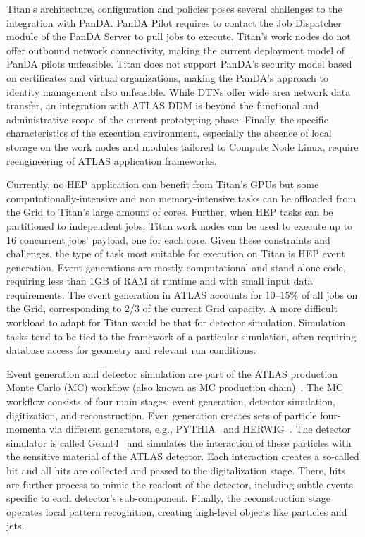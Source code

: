 Titan's architecture, configuration and policies poses several challenges to the
integration with PanDA. PanDA Pilot requires to contact the Job Dispatcher
module of the PanDA Server to pull jobs to execute. Titan's work nodes do not
offer outbound network connectivity, making the current deployment model of
PanDA pilots unfeasible. Titan does not support PanDA's security model based on
certificates and virtual organizations, making the PanDA's approach to identity
management also unfeasible. While DTNs offer wide area network data transfer, an
integration with ATLAS DDM is beyond the functional and administrative scope of
the current prototyping phase. Finally, the specific characteristics of the
execution environment, especially the absence of local storage on the work nodes
and modules tailored to Compute Node Linux, require reengineering of ATLAS
application frameworks.

Currently, no HEP application can benefit from Titan's GPUs but some
computationally-intensive and non memory-intensive tasks can be offloaded from
the Grid to Titan's large amount of cores. Further, when HEP tasks can be
partitioned to independent jobs, Titan work nodes can be used to execute up to
16 concurrent jobs' payload, one for each core. Given these constraints and
challenges, the type of task most suitable for execution on Titan is HEP event
generation. Event generations are mostly computational and stand-alone code,
requiring less than 1GB of RAM at runtime and with small input data
requirements. The event generation in ATLAS accounts for 10--15\% of all jobs on
the Grid, corresponding to 2/3 of the current Grid capacity. A more difficult
workload to adapt for Titan would be that for detector simulation. Simulation
tasks tend to be tied to the framework of a particular simulation, often
requiring database access for geometry and relevant run conditions.


Event generation and detector simulation are part of the ATLAS production Monte
Carlo (MC) workflow (also known as MC production chain)~\cite{mcworkflow}. The
MC workflow consists of four main stages: event generation, detector simulation,
digitization, and reconstruction. Even generation creates sets of particle
four-momenta via different generators, e.g., PYTHIA~\cite{herwig} and
HERWIG~\cite{herwig}. The detector simulator is called Geant4~\cite{geant4} and
simulates the interaction of these particles with the sensitive material of the
ATLAS detector. Each interaction creates a so-called hit and all hits are
collected and passed to the digitalization stage. There, hits are further
process to mimic the readout of the detector, including subtle events specific
to each detector's sub-component. Finally, the reconstruction stage operates
local pattern recognition, creating high-level objects like particles and jets.

